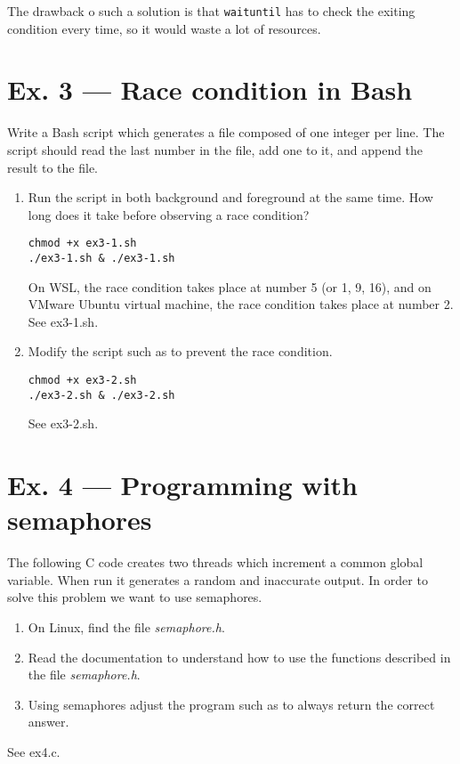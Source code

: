 \documentclass[a4paper]{article}
\begin{document}
The drawback o such a solution is that \texttt{waituntil} has to check the exiting condition every time, so it would waste a lot of resources.
\section*{Ex. 3 — Race condition in Bash}
Write a Bash script which generates a file composed of one integer per line. The script should read the last number in the file, add one to it, and append the result to the file.
\begin{enumerate}
    \item Run the script in both background and foreground at the same time. How long does it take before observing a race condition?
    \begin{verbatim}
chmod +x ex3-1.sh
./ex3-1.sh & ./ex3-1.sh
    \end{verbatim}
    On WSL, the race condition takes place at number 5 (or 1, 9, 16), and on VMware Ubuntu virtual machine, the race condition takes place at number 2.\\
    See ex3-1.sh.
    \item Modify the script such as to prevent the race condition.
    \begin{verbatim}
chmod +x ex3-2.sh
./ex3-2.sh & ./ex3-2.sh
    \end{verbatim}
    See ex3-2.sh.
\end{enumerate}
\section*{Ex. 4 — Programming with semaphores}
The following C code creates two threads which increment a common global variable. When run it generates a random and inaccurate output. In order to solve this problem we want to use semaphores.
\begin{enumerate}
    \item On Linux, find the file \textit{semaphore.h}.
    \item Read the documentation to understand how to use the functions described in the file \textit{semaphore.h}.
    \item Using semaphores adjust the program such as to always return the correct answer.
\end{enumerate}
See ex4.c.
\end{document}
